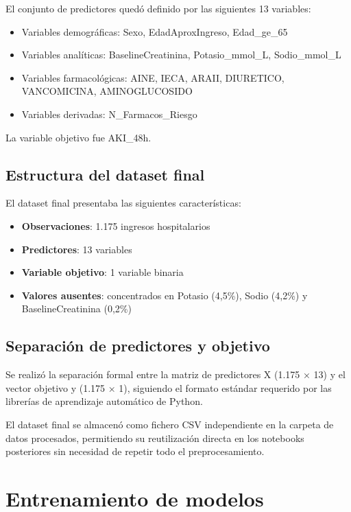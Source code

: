 \documentclass[12pt, a4paper, oneside]{report}
\begin{document}
El conjunto de predictores quedó definido por las siguientes 13 variables:

\begin{itemize}
    \item Variables demográficas: Sexo, EdadAproxIngreso, Edad\_ge\_65
    \item Variables analíticas: BaselineCreatinina, Potasio\_mmol\_L, Sodio\_mmol\_L
    \item Variables farmacológicas: AINE, IECA, ARAII, DIURETICO, VANCOMICINA, AMINOGLUCOSIDO
    \item Variables derivadas: N\_Farmacos\_Riesgo
\end{itemize}

La variable objetivo fue AKI\_48h.

\subsection{Estructura del dataset final}

El dataset final presentaba las siguientes características:

\begin{itemize}
    \item \textbf{Observaciones}: 1.175 ingresos hospitalarios
    \item \textbf{Predictores}: 13 variables
    \item \textbf{Variable objetivo}: 1 variable binaria
    \item \textbf{Valores ausentes}: concentrados en Potasio (4,5\%), Sodio (4,2\%) y BaselineCreatinina (0,2\%)
\end{itemize}

\subsection{Separación de predictores y objetivo}

Se realizó la separación formal entre la matriz de predictores X (1.175 × 13) y el vector objetivo y (1.175 × 1), siguiendo el formato estándar requerido por las librerías de aprendizaje automático de Python.

El dataset final se almacenó como fichero CSV independiente en la carpeta de datos procesados, permitiendo su reutilización directa en los notebooks posteriores sin necesidad de repetir todo el preprocesamiento.

\section{Entrenamiento de modelos}
\end{document}
